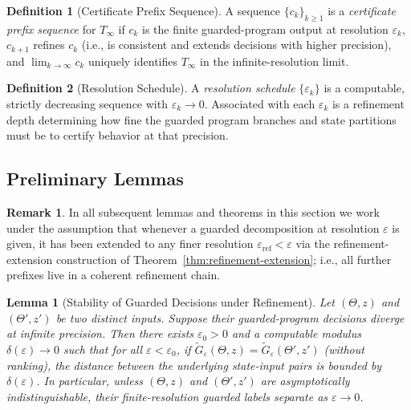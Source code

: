 \documentclass[12pt]{article}
\theoremstyle{definition}
\newtheorem{definition}{Definition}[section]
\newtheorem{remark}{Remark}[section]
\theoremstyle{plain}
\newtheorem{lemma}{Lemma}[section]
\begin{document}
\begin{definition}[Certificate Prefix Sequence]
A sequence \(\{c_k\}_{k\ge1}\) is a \emph{certificate prefix sequence} for \(T_\infty\) if \(c_k\) is the finite guarded-program output at resolution \(\varepsilon_k\), \(c_{k+1}\) refines \(c_k\) (i.e., is consistent and extends decisions with higher precision), and \(\lim_{k\to\infty} c_k\) uniquely identifies \(T_\infty\) in the infinite-resolution limit.
\end{definition}

\begin{definition}[Resolution Schedule]
A \emph{resolution schedule} \(\{\varepsilon_k\}\) is a computable, strictly decreasing sequence with \(\varepsilon_k\to0\). Associated with each \(\varepsilon_k\) is a refinement depth determining how fine the guarded program branches and state partitions must be to certify behavior at that precision.
\end{definition}

\subsection{Preliminary Lemmas}
\label{sub:dbd-lemmas}


\begin{remark}
In all subsequent lemmas and theorems in this section we work under the assumption that whenever a guarded decomposition at resolution $\varepsilon$ is given, it has been extended to any finer resolution $\varepsilon_{\mathrm{ref}}<\varepsilon$ via the refinement-extension construction of Theorem~\ref{thm:refinement-extension}; i.e., all further prefixes live in a coherent refinement chain.
\end{remark}


\begin{lemma}[Stability of Guarded Decisions under Refinement]
\label{lem:stability-guarded}
Let \((\Theta,z)\) and \((\Theta',z')\) be two distinct inputs. Suppose their guarded-program decisions diverge at infinite precision. Then there exists \(\varepsilon_0>0\) and a computable modulus \(\delta(\varepsilon)\to0\) such that for all \(\varepsilon<\varepsilon_0\), if \(\tilde G_\varepsilon(\Theta,z)=\tilde G_\varepsilon(\Theta',z')\) (without ranking), the distance between the underlying state-input pairs is bounded by \(\delta(\varepsilon)\). In particular, unless \((\Theta,z)\) and \((\Theta',z')\) are asymptotically indistinguishable, their finite-resolution guarded labels separate as \(\varepsilon\to0\).
\end{lemma}
\end{document}
